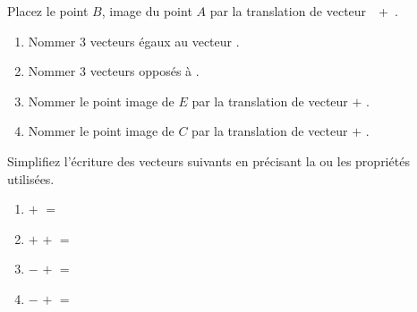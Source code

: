 \exercice Placez le point $B$, image du point $A$ par la translation de vecteur~~+~.\\



\exercice
\begin{enumerate}
	\item Nommer 3 vecteurs égaux au vecteur .
	\item Nommer 3 vecteurs opposés à .
	\item Nommer le point image de $E$ par la translation de vecteur  $+$ .
	\item Nommer le point image de $C$ par la translation de vecteur  $+$ .

\end{enumerate}


\newpage

\exercice Simplifiez l'écriture des vecteurs suivants en précisant la ou les propriétés utilisées.

\begin{enumerate}
	\item {} $+$  $=$ \\
	\item {} $+$  $+$  $=$ \\
	\item {} $-$  $+$  $=$ \\
	\item {} $-$  $+$  $=$ \\
\end{enumerate}

